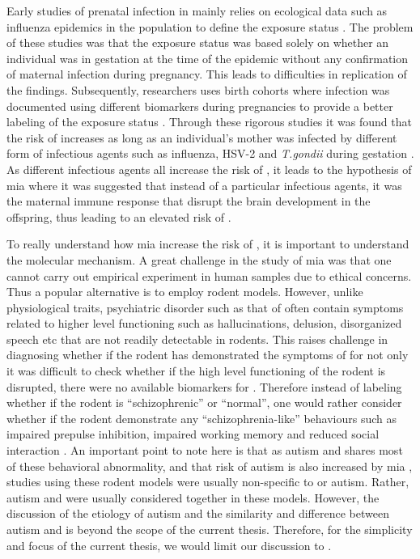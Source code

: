 	Early studies of prenatal infection in  mainly relies on ecological data such as influenza epidemics in the population to define the exposure status \citep{Brown2010}.
	The problem of these studies was that the exposure status was based solely on whether an individual was in gestation at the time of the epidemic without any confirmation of maternal infection during pregnancy.
	This leads to difficulties in replication of the findings.
	Subsequently, researchers uses birth cohorts where infection was documented using different biomarkers during pregnancies to provide a better labeling of the exposure status \citep{Brown2010}.
	Through these rigorous studies it was found that the risk of  increases as long as an individual's mother was infected by different form of infectious agents such as influenza, HSV-2 and \textit{T.gondii} during gestation \citep{Brown2010}.
	As different infectious agents all increase the risk of , it leads to the hypothesis of \gls{mia} \citep{Brown2010} where it was suggested that instead of a particular infectious agents, it was the maternal immune response that disrupt the brain development in the offspring, thus leading to an elevated risk of .
	
	To really understand how \gls{mia} increase the risk of , it is important to understand the molecular mechanism.
	A great challenge in the study of \gls{mia} was that one cannot carry out empirical experiment in human samples due to ethical concerns.
	Thus a popular alternative is to employ rodent models.
	However, unlike physiological traits, psychiatric disorder such as that of  often contain symptoms related to higher level functioning such as hallucinations, delusion, disorganized speech etc \citep{AmericanPsychiatricAssociation2013} that are not readily detectable in rodents.
	This raises challenge in diagnosing whether if the rodent has demonstrated the symptoms of  for not only it was difficult to check whether if the high level functioning of the rodent is disrupted, there were no available biomarkers for .
	Therefore instead of labeling whether if the rodent is ``schizophrenic'' or ``normal'', one would rather consider whether if the rodent demonstrate any ``schizophrenia-like'' behaviours such as impaired prepulse inhibition, impaired working memory and reduced social interaction \citep{Meyer2007a}.
	An important point to note here is that as autism and  shares most of these behavioral abnormality, and that risk of autism is also increased by \gls{mia} \citep{Brown2012}, studies using these rodent models were usually non-specific to  or autism. 
	Rather, autism and  were usually considered together in these models.
	However, the discussion of the etiology of autism and the similarity and difference between autism and  is beyond the scope of the current thesis.
	Therefore, for the simplicity and focus of the current thesis, we would limit our discussion to .
	
